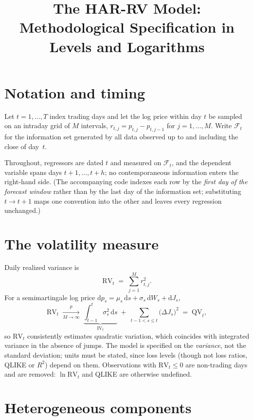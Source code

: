 \documentclass[11pt,a4paper]{article}
\title{The HAR-RV Model:\\ Methodological Specification in Levels and Logarithms}
\date{}
\newcommand{\RV}{\mathrm{RV}}
\newcommand{\IV}{\mathrm{IV}}
\newcommand{\QV}{\mathrm{QV}}
\newcommand{\Fset}{\mathcal{F}}
\newcommand{\dd}{\mathrm{d}}
\begin{document}
\maketitle


\section{Notation and timing}
\label{sec:notation}

Let $t=1,\dots,T$ index trading days and let the log price within day $t$ be sampled on an
intraday grid of $M$ intervals, $r_{t,j}=p_{t,j}-p_{t,j-1}$ for $j=1,\dots,M$. Write
$\Fset_t$ for the information set generated by all data observed up to and including the
close of day~$t$.

Throughout, regressors are dated $t$ and measured on $\Fset_t$, and the dependent variable
spans days $t+1,\dots,t+h$; no contemporaneous information enters the right-hand side. (The
accompanying code indexes each row by the \emph{first day of the forecast window} rather
than by the last day of the information set; substituting $t\to t+1$ maps one convention
into the other and leaves every regression unchanged.)

\section{The volatility measure}
\label{sec:measure}

Daily realized variance is
\begin{equation}
  \RV_t \;=\; \sum_{j=1}^{M} r_{t,j}^{2}.
  \label{eq:rv}
\end{equation}
For a semimartingale log price $\dd p_s=\mu_s\,\dd s+\sigma_s\,\dd W_s+\dd J_s$,
\begin{equation}
  \RV_t \;\xrightarrow[M\to\infty]{p}\;
  \underbrace{\int_{t-1}^{t}\sigma_s^{2}\,\dd s}_{\IV_t}
  \;+\;\sum_{t-1<s\le t}\bigl(\Delta J_s\bigr)^{2}
  \;=\;\QV_t ,
  \label{eq:qv}
\end{equation}
so $\RV_t$ consistently estimates quadratic variation, which coincides with integrated
variance in the absence of jumps. The model is specified on the \emph{variance}, not the
standard deviation; units must be stated, since loss levels (though not loss ratios, QLIKE
or $R^{2}$) depend on them. Observations with $\RV_t\le 0$ are non-trading days and are
removed: $\ln \RV_t$ and QLIKE are otherwise undefined.

\section{Heterogeneous components}
\label{sec:components}
\end{document}
